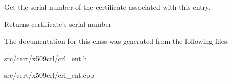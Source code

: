 Get the serial number of the certificate associated with this entry. \begin{DoxyReturn}{Returns}
certificate's serial number 
\end{DoxyReturn}


The documentation for this class was generated from the following files\-:\begin{DoxyCompactItemize}
\item 
src/cert/x509crl/crl\-\_\-ent.\-h\item 
src/cert/x509crl/crl\-\_\-ent.\-cpp\end{DoxyCompactItemize}
